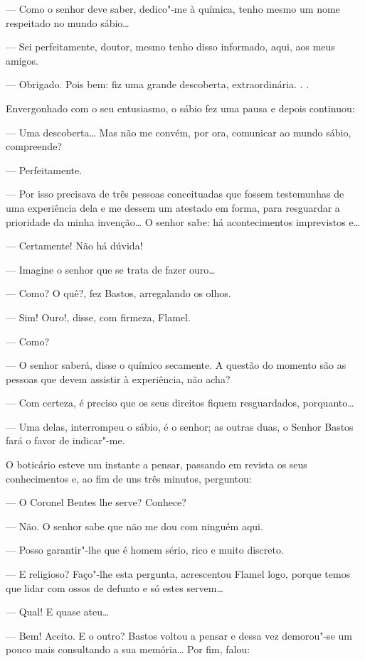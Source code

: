 --- Como o senhor deve saber, dedico"-me à química, tenho mesmo um nome
respeitado no mundo sábio\ldots{}

--- Sei perfeitamente, doutor, mesmo tenho disso informado, aqui, aos
meus amigos.

--- Obrigado. Pois bem: fiz uma grande descoberta, extraordinária. . .

Envergonhado com o seu entusiasmo, o sábio fez uma pausa e depois
continuou:

--- Uma descoberta\ldots{} Mas não me convém, por ora, comunicar ao mundo
sábio, compreende?

--- Perfeitamente.

--- Por isso precisava de três pessoas conceituadas que fossem
testemunhas de uma experiência dela e me dessem um atestado em forma,
para resguardar a prioridade da minha invenção\ldots{} O senhor sabe: há
acontecimentos imprevistos e\ldots{}

--- Certamente! Não há dúvida!

--- Imagine o senhor que se trata de fazer ouro\ldots{}

--- Como? O quê?, fez Bastos, arregalando os olhos.

--- Sim! Ouro!, disse, com firmeza, Flamel.

--- Como?

--- O senhor saberá, disse o químico secamente. A questão do momento são
as pessoas que devem assistir à experiência, não acha?

--- Com certeza, é preciso que os seus direitos fiquem resguardados,
porquanto\ldots{}

--- Uma delas, interrompeu o sábio, é o senhor; as outras duas, o Senhor
Bastos fará o favor de indicar"-me.

O boticário esteve um instante a pensar, passando em revista os seus
conhecimentos e, ao fim de uns três minutos, perguntou:

--- O Coronel Bentes lhe serve? Conhece?

--- Não. O senhor sabe que não me dou com ninguém aqui.

--- Posso garantir"-lhe que é homem sério, rico e muito discreto.

--- E religioso? Faço"-lhe esta pergunta, acrescentou Flamel logo, porque
temos que lidar com ossos de defunto e só estes servem\ldots{}

--- Qual! E quase ateu\ldots{}

--- Bem! Aceito. E o outro? Bastos voltou a pensar e dessa vez
demorou"-se um pouco mais consultando a sua memória\ldots{} Por fim, falou:

